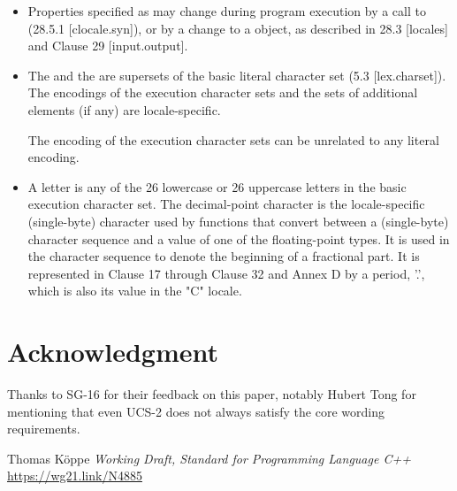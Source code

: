 \documentclass{wg21}
\begin{document}
\begin{itemize}
\item Properties specified as  may change during program execution by a call to  (28.5.1 [clocale.syn]), or by a change to a  object, as described in 28.3 [locales] and Clause 29 [input.output].
\item The  and the  are supersets of the basic literal character set (5.3 [lex.charset]). The encodings of the execution character sets and the sets of additional elements (if any) are locale-specific.  \begin{note}
The encoding of the execution character sets can be unrelated to any literal encoding.
\end{note}
\item A letter is any of the 26 lowercase or 26 uppercase letters in the basic execution character set.
The decimal-point character is the locale-specific (single-byte) character used by functions that convert between a (single-byte) character sequence and a value of one of the floating-point types. It is used in the character sequence to denote the beginning of a fractional part. It is represented in Clause 17 through Clause 32 and Annex D by a period, ’.’, which is also its value in the "C" locale.
\end{itemize}

\section{Acknowledgment}

Thanks to SG-16 for their feedback on this paper, notably Hubert Tong for mentioning that even UCS-2 does not always satisfy the core wording requirements.





\renewcommand{\section}[2]{}%
\begin{thebibliography}{9}
    Thomas Köppe
    \emph{Working Draft, Standard for Programming Language C++}\newline
    \url{https://wg21.link/N4885}
\end{thebibliography}
\end{document}
